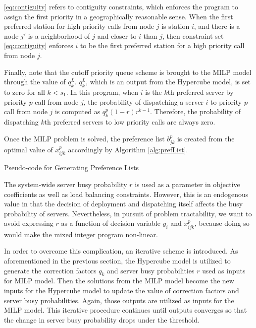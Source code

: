 \documentclass{article}
\begin{document}
\eqref{eq:contiguity} refers to contiguity constraints, which enforces the program to assign the first priority in a geographically reasonable sense. When the first preferred station for high priority calls from node $j$ is station $i$, and there is a node $j'$ is a neighborhood of $j$ and closer to $i$ than $j$, then constraint set \eqref{eq:contiguity} enforces $i$ to be the first preferred station for a high priority call from node $j$. %

Finally, note that the cutoff priority queue scheme is brought to the MILP model through the value of $q_k^L$. $q_k^L$, which is an output from the Hypercube model, is set to zero for all $k<s_1$. In this program, when $i$ is the $k$th preferred server by priority $p$ call from node $j$, the probability of dispatching a server $i$ to priority $p$ call from node $j$ is computed as $q_k^p (1-r) r^{k-1}$. Therefore, the probability of dispatching $k$th preferred servers to low priority calls are always zero.

Once the MILP problem is solved, the preference list $b^p_{jk}$ is created from the optimal value of $x^p_{ijk}$ accordingly by Algorithm \ref{alg:prefList}.

\begin{algorithm}[H]
\SetAlgoLined
\caption{Pseudo-code for Generating Preference Lists}
\label{alg:prefList}
\end{algorithm}

The system-wide server busy probability $r$ is used as a parameter in objective coefficients as well as load balancing constraints. However, this is an endogenous value in that the decision of deployment and dispatching itself affects the busy probability of servers. Nevertheless, in pursuit of problem tractability, we want to avoid expressing $r$ as a function of decision variable $y_i$ and $x^p_{ijk}$, because doing so would make the mixed integer program non-linear.

In order to overcome this complication, an iterative scheme is introduced. As aforementioned in the previous section, the Hypercube model is utilized to generate the correction factors $q_k$ and server busy probabilities $r$ used as inputs for MILP model. Then the solutions from the MILP model become the new inputs for the Hypercube model to update the value of correction factors and server busy probabilities. Again, those outputs are utilized as inputs for the MILP model. This iterative procedure continues until outputs converges so that the change in server busy probability drops under the threshold.
\end{document}
